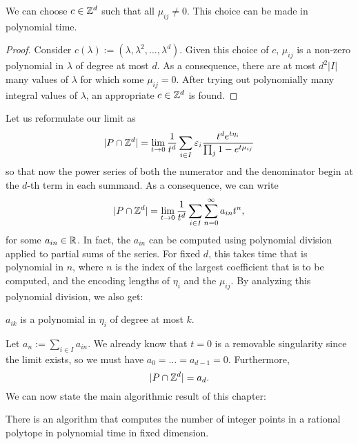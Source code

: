 \begin{lemma}
  We can choose $c \in \mathbb{Z}^d$ such that all $\mu_{ij} \neq 0$.
  This choice can be made in polynomial time.
\end{lemma}
\begin{proof}
  Consider $c(\lambda) := (\lambda, \lambda^2, \dots, \lambda^d)$.
  Given this choice of $c$,
  $\mu_{ij}$ is a non-zero polynomial in $\lambda$ of degree at most $d$.
  As a consequence, there are at most $d^2 |I|$ many values of $\lambda$ for which some $\mu_{ij} = 0$.
  After trying out polynomially many  integral values of $\lambda$,
  an appropriate $c \in \mathbb{Z}^d$ is found.
\end{proof}

Let us reformulate our limit as
\[
  |P \cap \mathbb{Z}^d| = \lim_{t \to 0} \frac{1}{t^d} \sum_{i \in I} \varepsilon_i \frac{t^d e^{t \eta_i}}{\prod_j 1 - e^{t \mu_{ij}}}
\]
so that now the power series of both the numerator and the denominator begin at the $d$-th term
in each summand.
As a consequence, we can write
\[
  |P \cap \mathbb{Z}^d| = \lim_{t \to 0} \frac{1}{t^d} \sum_{i \in I} \sum_{n=0}^\infty a_{in} t^n,
\]
for some $a_{in} \in \mathbb{R}$.
In fact, the $a_{in}$ can be computed using polynomial division applied to partial sums of the series.
For fixed $d$, this takes time that is polynomial in $n$,
where $n$ is the index of the largest coefficient that is to be computed,
and the encoding lengths of $\eta_i$ and the $\mu_{ij}$.
By analyzing this polynomial division, we also get:

\begin{fact}
  \label{fact:a_ik-polynomial}
  $a_{ik}$ is a polynomial in $\eta_i$ of degree at most $k$.
\end{fact}

Let $a_n := \sum_{i \in I} a_{in}$.
We already know that $t = 0$ is a removable singularity since the limit exists,
so we must have $a_0 = \dots = a_{d-1} = 0$. Furthermore,
\[
  |P \cap \mathbb{Z}^d| = a_d.
\]
We can now state the main algorithmic result of this chapter:

\begin{theorem}
  There is an algorithm that computes the number of integer points in a rational polytope
  in polynomial time in fixed dimension.
\end{theorem}

